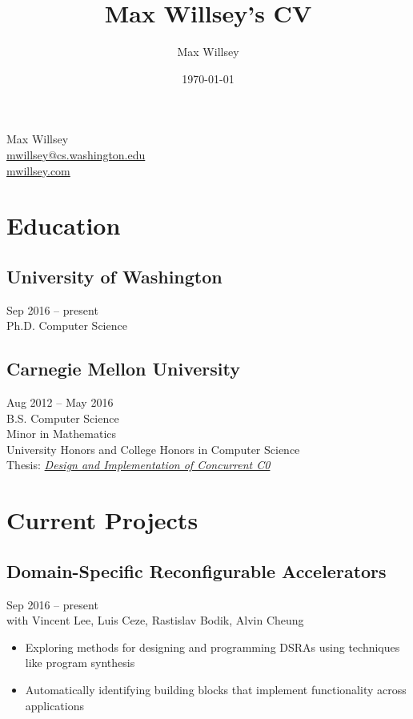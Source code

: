\documentclass{article}
\title{Max Willsey's CV}
\date{\today}
\author{Max Willsey}
\begin{document}
\begin{center}
  {\LARGE Max Willsey} \\
  \vspace{1em}
  \sf
  \href{mailto:mwillsey@cs.washington.edu}{mwillsey@cs.washington.edu} \\
  \href{http://mwillsey.com}{mwillsey.com}
\end{center}

\section{Education}

\subsection{University of Washington}
\hfill Sep 2016 -- present \\
Ph.D. Computer Science

\subsection{Carnegie Mellon University}
\hfill Aug 2012 -- May 2016 \\
B.S. Computer Science \\
Minor in Mathematics \\
University Honors and College Honors in Computer Science \\
Thesis: \href{http://maxwillsey.com/papers/cc0-thesis.pdf}{\textit{Design and Implementation of Concurrent C0}}

\section{Current Projects}

\subsection{Domain-Specific Reconfigurable Accelerators}
\hfill Sep 2016 -- present\\
with Vincent Lee, Luis Ceze, Rastislav Bodik, Alvin Cheung
\begin{itemize}
\item Exploring methods for designing and programming DSRAs using techniques like program synthesis
\item Automatically identifying building blocks that implement functionality across applications
\end{itemize}
\end{document}

